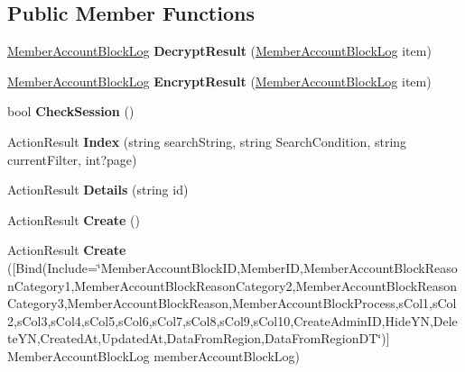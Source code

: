 \subsection*{Public Member Functions}
\begin{DoxyCompactItemize}
\item 
\hyperlink{a00135}{Member\+Account\+Block\+Log} {\bfseries Decrypt\+Result} (\hyperlink{a00135}{Member\+Account\+Block\+Log} item)\hypertarget{a00136_a97389f0f0204050445f355bf1fd3eb60}{}\label{a00136_a97389f0f0204050445f355bf1fd3eb60}

\item 
\hyperlink{a00135}{Member\+Account\+Block\+Log} {\bfseries Encrypt\+Result} (\hyperlink{a00135}{Member\+Account\+Block\+Log} item)\hypertarget{a00136_a2992caf1ef28e0e062294884f46c40ad}{}\label{a00136_a2992caf1ef28e0e062294884f46c40ad}

\item 
bool {\bfseries Check\+Session} ()\hypertarget{a00136_acccca9b93b2ddad405f761dc4922d883}{}\label{a00136_acccca9b93b2ddad405f761dc4922d883}

\item 
Action\+Result {\bfseries Index} (string search\+String, string Search\+Condition, string current\+Filter, int?page)\hypertarget{a00136_ae17174978a9678a49f256de92d0ca141}{}\label{a00136_ae17174978a9678a49f256de92d0ca141}

\item 
Action\+Result {\bfseries Details} (string id)\hypertarget{a00136_aaa502eb3cc7fe1d73cd04bdf354cfcf3}{}\label{a00136_aaa502eb3cc7fe1d73cd04bdf354cfcf3}

\item 
Action\+Result {\bfseries Create} ()\hypertarget{a00136_ac59edd15b463a7195a49330c6fb2e6e8}{}\label{a00136_ac59edd15b463a7195a49330c6fb2e6e8}

\item 
Action\+Result {\bfseries Create} (\mbox{[}Bind(Include=\char`\"{}Member\+Account\+Block\+ID,Member\+ID,Member\+Account\+Block\+Reason\+Category1,Member\+Account\+Block\+Reason\+Category2,Member\+Account\+Block\+Reason\+Category3,Member\+Account\+Block\+Reason,Member\+Account\+Block\+Process,s\+Col1,s\+Col2,s\+Col3,s\+Col4,s\+Col5,s\+Col6,s\+Col7,s\+Col8,s\+Col9,s\+Col10,Create\+Admin\+ID,Hide\+YN,Delete\+YN,Created\+At,Updated\+At,Data\+From\+Region,Data\+From\+Region\+DT\char`\"{})\mbox{]} Member\+Account\+Block\+Log member\+Account\+Block\+Log)\hypertarget{a00136_aea8e7cb4932f4925e60ff2d8b5213f09}{}\label{a00136_aea8e7cb4932f4925e60ff2d8b5213f09}


\end{DoxyCompactItemize}
